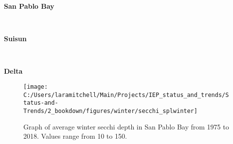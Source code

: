 \documentclass[
]{book}
\begin{document}
\begin{panel-grid}

\begin{columns-nocenter}

\begin{column800}

\textbf{San Pablo Bay}

\end{column800}

\begin{column40}

~

\end{column40}

\begin{column800}

\textbf{Suisun}

\end{column800}

\begin{column40}

~

\end{column40}

\begin{column800}

\textbf{Delta}

\end{column800}

\end{columns-nocenter}

\begin{columns-nocenter}

\begin{column800}

\begin{expand}

\begin{figure}
\texttt{[image: C:/Users/laramitchell/Main/Projects/IEP\_status\_and\_trends/Status-and-Trends/2\_bookdown/figures/winter/secchi\_splwinter]} \caption{Graph of average winter secchi depth in San Pablo Bay from 1975 to 2018. Values range from 10 to 150.}\label{fig:unnamed-chunk-146}
\end{figure}

\end{expand}

\end{column800}

\begin{column40}

~


\end{column40}
\end{columns-nocenter}
\end{panel-grid}
\end{document}
